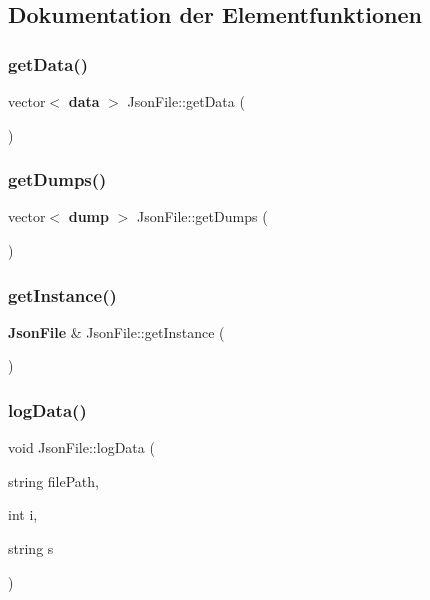 \subsection{Dokumentation der Elementfunktionen}
\mbox{\label{class_json_file_a5920a87442b0f6250e3013362d10b0b5}} 
\subsubsection{get\+Data()}
{\footnotesize\ttfamily vector$<$ \textbf{ data} $>$ Json\+File\+::get\+Data (\begin{DoxyParamCaption}{ }\end{DoxyParamCaption})}

\mbox{\label{class_json_file_a973aa4aba725db652ddb6edd26ff8527}} 
\subsubsection{get\+Dumps()}
{\footnotesize\ttfamily vector$<$ \textbf{ dump} $>$ Json\+File\+::get\+Dumps (\begin{DoxyParamCaption}{ }\end{DoxyParamCaption})}

\mbox{\label{class_json_file_a70ea731be6e00b083190c011e0ee4392}} 
\subsubsection{get\+Instance()}
{\footnotesize\ttfamily \textbf{ Json\+File} \& Json\+File\+::get\+Instance (\begin{DoxyParamCaption}{ }\end{DoxyParamCaption})\hspace{0.3cm}{\ttfamily [static]}}

\mbox{\label{class_json_file_a69c66d052ccb40a11396f537787a6343}} 
\subsubsection{log\+Data()}
{\footnotesize\ttfamily void Json\+File\+::log\+Data (\begin{DoxyParamCaption}\item[{string}]{file\+Path,  }\item[{int}]{i,  }\item[{string}]{s }\end{DoxyParamCaption})}


